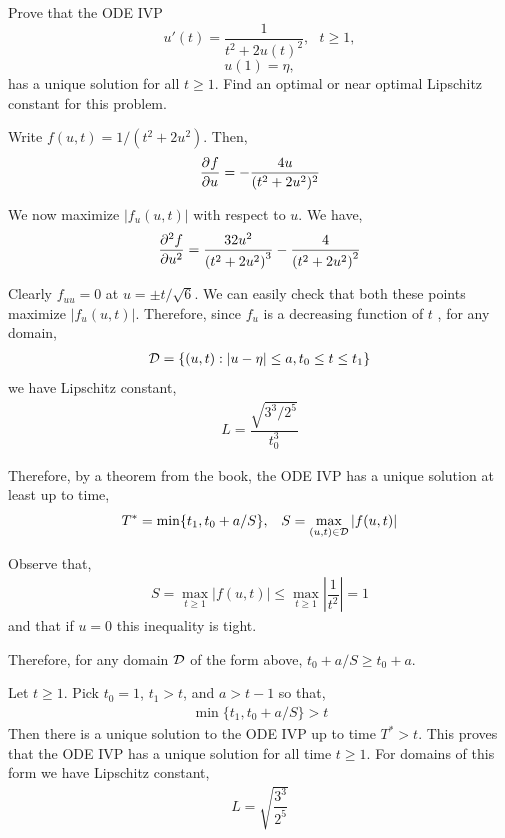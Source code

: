 \documentclass[10pt]{article}
\begin{document}
\maketitle



\begin{problem}[Problem 1]
Prove that the ODE IVP
\[
u' (t) = \frac{1}{t^2 + 2 u(t )^2} ,~~~ t \geq 1 ,
\]
\[
u(1) = \eta ,
\]
has a unique solution for all \( t \geq 1 \).  Find an optimal or near optimal Lipschitz constant
for this problem.
\end{problem}

\begin{solution}[Solution]
Write \( f(u,t) = 1/(t^2+2u^2) \). Then,
\begin{align*}
    \pp{f}{u} = -\dfrac{4 u}{(t^2+2u^2)^2}
\end{align*}

We now maximize \( |f_u(u,t)| \) with respect to \( u \).
We have,
\begin{align*}
    \pp[2]{f}{u} = \frac{32 u^2}{\left(t^2+2 u^2\right)^3}-\frac{4}{\left(t^2+2 u^2\right)^2}
\end{align*}

Clearly \( f_{uu} = 0 \) at \( u = \pm t / \sqrt{6} \). We can easily check that both these points maximize \( |f_u(u,t)| \). Therefore, since \( f_u \) is a decreasing function of \( t \) , for any domain,
\begin{align*}
    \cD = \{(u,t) : |u-\eta| \leq a, t_0 \leq t \leq t_1 \}
\end{align*}
we have Lipschitz constant,
\begin{align*}
    L = \dfrac{\sqrt{3^3/2^5}}{t_0^3}
\end{align*}

Therefore, by a theorem from the book, the ODE IVP has a unique solution at least up to time,
\begin{align*}
    T^* = \min\{ t_1,t_0 + a/S \}, && S = \max_{(u,t)\in \cD} |f(u,t)|
\end{align*}

Observe that,
\begin{align*}
    S = \max_{t\geq 1} |f(u,t)|
    \leq \max_{t\geq 1} \left|\dfrac{1}{t^2}\right|
    = 1
\end{align*}
and that if \( u = 0 \) this inequality is tight.

Therefore, for any domain \( \cD \) of the form above, \( t_0 + a/S \geq t_0 + a \).

Let \( t\geq 1 \). Pick \( t_0 = 1 \), \( t_1 > t \), and \( a > t-1 \) so that,
\begin{align*}
    \min\{t_1, t_0 + a/S\} > t
\end{align*}
Then there is a unique solution to the ODE IVP up to time \( T^* > t \). This proves that the ODE IVP has a unique solution for all time \( t\geq 1 \).
For domains of this form we have Lipschitz constant,
\begin{align*}
    L = \sqrt{\dfrac{3^3}{2^5}}
\end{align*}


\end{solution}
\end{document}
